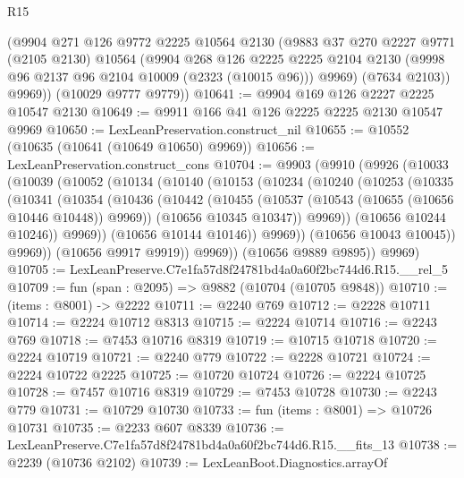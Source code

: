 \begin{lexlean}{R15}
\begin{coremodule}
        (@9904
          @271
          @126
          @9772
          @2225
          @10564
          @2130
          (@9883
            @37
            @270
            @2227
            @9771
            (@2105 @2130)
            @10564
            (@9904
              @268
              @126
              @2225
              @2225
              @2104
              @2130
              (@9998 @96 @2137 @96 @2104 @10009 (@2323 (@10015 @96)))
              @9969)
            (@7634 @2103))
          @9969))
      (@10029 @9777 @9779))
@10641 := @9904 @169 @126 @2227 @2225 @10547 @2130
@10649 := @9911 @166 @41 @126 @2225 @2225 @2130 @10547 @9969
@10650 := LexLeanPreservation.construct_nil
@10655 := @10552 (@10635 (@10641 (@10649 @10650) @9969))
@10656 := LexLeanPreservation.construct_cons
@10704 := @9903
    (@9910
      (@9926
        (@10033
          (@10039
            (@10052
              (@10134
                (@10140
                  (@10153
                    (@10234
                      (@10240
                        (@10253
                          (@10335
                            (@10341
                              (@10354
                                (@10436
                                  (@10442
                                    (@10455
                                      (@10537 (@10543 (@10655 (@10656 @10446 @10448)) @9969))
                                      (@10656 @10345 @10347))
                                    @9969))
                                (@10656 @10244 @10246))
                              @9969))
                          (@10656 @10144 @10146))
                        @9969))
                    (@10656 @10043 @10045))
                  @9969))
              (@10656 @9917 @9919))
            @9969))
        (@10656 @9889 @9895))
      @9969)
@10705 := LexLeanPreserve.C7e1fa57d8f24781bd4a0a60f2bc744d6.R15.__rel_5
@10709 := fun (span : @2095) => @9882 (@10704 (@10705 @9848))
@10710 := (items : @8001) -> @2222
@10711 := @2240 @769
@10712 := @2228 @10711
@10714 := @2224 @10712 @8313
@10715 := @2224 @10714
@10716 := @2243 @769
@10718 := @7453 @10716 @8319
@10719 := @10715 @10718
@10720 := @2224 @10719
@10721 := @2240 @779
@10722 := @2228 @10721
@10724 := @2224 @10722 @2225
@10725 := @10720 @10724
@10726 := @2224 @10725
@10728 := @7457 @10716 @8319
@10729 := @7453 @10728
@10730 := @2243 @779
@10731 := @10729 @10730
@10733 := fun (items : @8001) => @10726 @10731
@10735 := @2233 @607 @8339
@10736 := LexLeanPreserve.C7e1fa57d8f24781bd4a0a60f2bc744d6.R15.__fits_13
@10738 := @2239 (@10736 @2102)
@10739 := LexLeanBoot.Diagnostics.arrayOf

\end{coremodule}
\end{lexlean}
